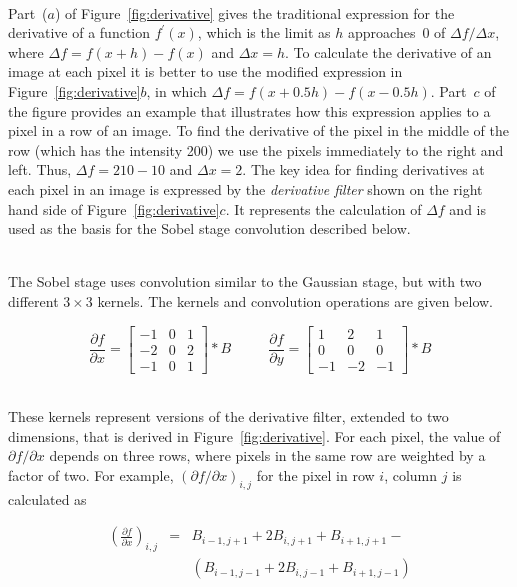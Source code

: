 \documentclass[epsfig,10pt,fullpage]{article}
\begin{document}
~\\
\noindent
Part~($a$) of Figure~\ref{fig:derivative} gives the traditional expression for 
the derivative of a function $f^\prime(x)$, which is the limit as $h$ approaches~0 of 
$\Delta{f}/\Delta{x}$, where $\Delta{f}=f(x+h)-f(x)$ and $\Delta{x} = h$. To calculate the 
derivative of an image at each pixel it is better to use the modified expression in 
Figure~\ref{fig:derivative}$b$, in which $\Delta{f} = f(x+0.5h) - f(x-0.5h)$. Part~$c$ of 
the figure provides an example that illustrates how this expression applies to a pixel in a row 
of an image. To find the derivative of the pixel in the middle of the row (which has the 
intensity 200) we use the pixels immediately to the right and left. Thus, 
$\Delta{f} = 210 - 10$ and $\Delta{x} = 2$. The key idea for finding derivatives at each 
pixel in an image is expressed by the {\it derivative filter} shown on the right hand side 
of Figure~\ref{fig:derivative}$c$. It represents the calculation of $\Delta{f}$ and is used 
as the basis for the Sobel stage convolution described below.

~\\
\noindent
The Sobel stage uses convolution similar to the Gaussian stage, but with two different 
$3 \times 3$ kernels. The kernels and convolution operations are given below.

\[
\frac{\partial{f}}{\partial{x}} = 
\begin{bmatrix}
    -1 & 0 & 1  \\
    -2 & 0 & 2  \\
    -1 & 0 & 1 
\end{bmatrix} * B
\ \ \ \ \ \ \  \ \ \ \ \  \frac{\partial{f}}{\partial{y}} = 
\begin{bmatrix}
    1 & 2 & 1 \\
    0 & 0 & 0 \\
    -1 & -2 & -1
\end{bmatrix} * B
\]

~\\
\noindent
These kernels represent versions of the derivative filter, extended to two dimensions, that 
is derived in Figure~\ref{fig:derivative}. For each pixel, the value of 
${\partial{f}}/{\partial{x}}$ depends on three rows, where pixels in the same row are 
weighted by a factor of two. For example, $({\partial{f}}/{\partial{x}})_{i,j}$ for 
the pixel in row $i$, column $j$ is calculated as 

\begin{eqnarray*}
    \left(\frac{\partial{f}}{\partial{x}}\right)_{i, j}&=& B_{i-1, j+1} + 2 B_{i, j+1} + B_{i+1, j+1} -\\
    &&(B_{i-1, j-1} + 2 B_{i, j-1} + B_{i+1, j-1})
\end{eqnarray*}
\end{document}
